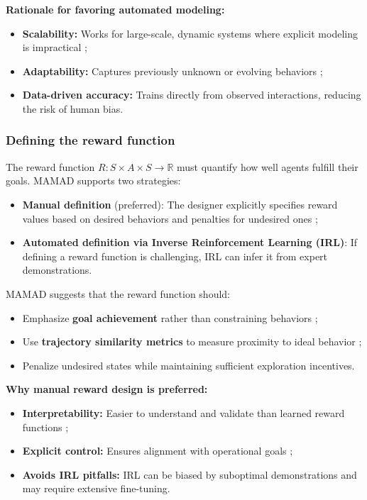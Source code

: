 \documentclass[pdflatex,sn-mathphys-num]{sn-jnl}%
\theoremstyle{thmstyleone}%
\theoremstyle{thmstyletwo}%
\theoremstyle{thmstylethree}%
\begin{document}
\noindent \textbf{Rationale for favoring automated modeling:}
\begin{itemize}
    \item \textbf{Scalability:} Works for large-scale, dynamic systems where explicit modeling is impractical ;
    \item \textbf{Adaptability:} Captures previously unknown or evolving behaviors ;
    \item \textbf{Data-driven accuracy:} Trains directly from observed interactions, reducing the risk of human bias.
\end{itemize}

\subsubsection{Defining the reward function}
The reward function $R: S \times A \times S \to \mathbb{R}$ must quantify how well agents fulfill their goals. MAMAD supports two strategies:
\begin{itemize}
    \item \textbf{Manual definition} (preferred): The designer explicitly specifies reward values based on desired behaviors and penalties for undesired ones ;
    \item \textbf{Automated definition via Inverse Reinforcement Learning (IRL)}: If defining a reward function is challenging, IRL can infer it from expert demonstrations.
\end{itemize}

MAMAD suggests that the reward function should:
\begin{itemize}
    \item Emphasize \textbf{goal achievement} rather than constraining behaviors ;
    \item Use \textbf{trajectory similarity metrics} to measure proximity to ideal behavior ;
    \item Penalize undesired states while maintaining sufficient exploration incentives.
\end{itemize}

\noindent \textbf{Why manual reward design is preferred:}
\begin{itemize}
    \item \textbf{Interpretability:} Easier to understand and validate than learned reward functions ;
    \item \textbf{Explicit control:} Ensures alignment with operational goals ;
    \item \textbf{Avoids IRL pitfalls:} IRL can be biased by suboptimal demonstrations and may require extensive fine-tuning.
\end{itemize}
\end{document}
